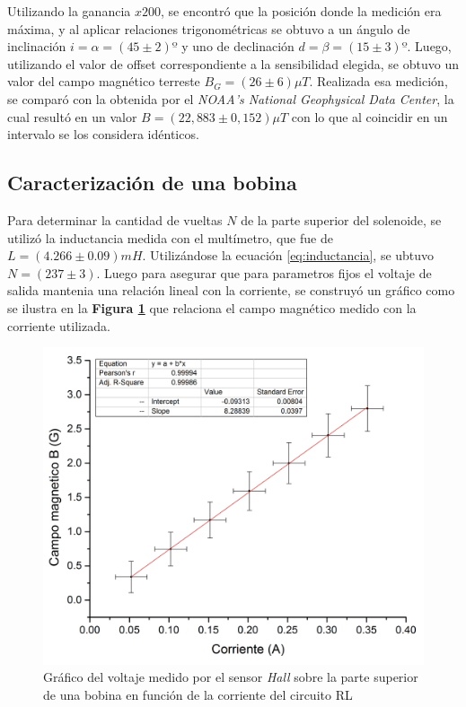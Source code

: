\documentclass[11pt,a4paper]{article}
\begin{document}
Utilizando la ganancia $x200$, se encontró que la posición donde la medición era máxima, y al aplicar relaciones trigonométricas se obtuvo a un ángulo de inclinación $i= \alpha = (45 \pm 2)º$ y uno de declinación $d= \beta=(15\pm 3)º$. Luego, utilizando el valor de offset correspondiente a la sensibilidad elegida, se obtuvo un valor del campo magnético terreste $B_{G} = (26 \pm 6)\mu T$. Realizada esa medición, se comparó con la obtenida por el \textit{NOAA's National Geophysical Data Center}, la cual resultó en un valor $B = (22,883 \pm 0,152)\mu T$ con lo que al coincidir en un intervalo se los considera idénticos.

\subsection{Caracterización de una bobina}

Para determinar la cantidad de vueltas $N$ de la parte superior del solenoide, se utilizó la inductancia medida con el multímetro, que fue de $L=(4.266 \pm 0.09)mH$. Utilizándose la ecuación \eqref{eq:inductancia}, se ubtuvo $N = (237 \pm 3)$. Luego para asegurar que para parametros fijos el voltaje de salida mantenia una relación lineal con la corriente, se construyó un gráfico como se ilustra en la \textbf{Figura \ref{fig:VeVs}} que relaciona el campo magnético medido con la corriente utilizada. 

\begin{figure}[H]
\centering
\includegraphics[scale=0.35]{campo_vs_Corriente_BC}
\caption{Gráfico del voltaje medido por el sensor \textit{Hall} sobre la parte superior de una bobina en función de la corriente del circuito RL}
\label{fig:VeVs}
\end{figure}
\end{document}
